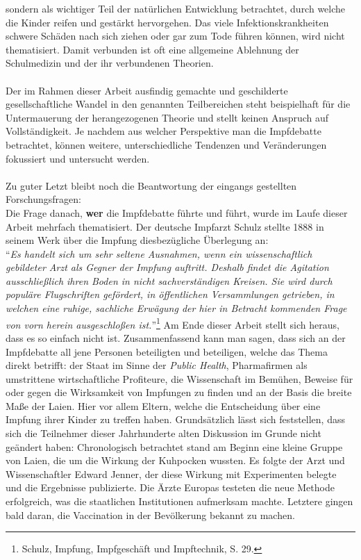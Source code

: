 \documentclass[
    a4paper,
    12pt,
    hyphens,
    chapterprefix=true,
    headheight=33pt,
    footheight=29pt,
    headings=optiontohead, %
]{scrartcl}
\begin{document}
{sondern als wichtiger Teil der natürlichen Entwicklung betrachtet, durch
welche die Kinder reifen und gestärkt hervorgehen. Das viele
Infektionskrankheiten schwere Schäden nach sich ziehen oder gar zum
Tode führen können, wird nicht thematisiert. Damit verbunden ist oft eine
allgemeine Ablehnung der Schulmedizin und der ihr verbundenen Theorien. \\
\\
Der im Rahmen dieser Arbeit ausfindig gemachte und geschilderte gesellschaftliche Wandel in den genannten Teilbereichen steht beispielhaft für die Untermauerung der herangezogenen Theorie und stellt keinen Anspruch auf Vollständigkeit. Je nachdem aus welcher Perspektive man die Impfdebatte betrachtet, können weitere, unterschiedliche Tendenzen und Veränderungen fokussiert und untersucht werden. \\
\\
Zu guter Letzt bleibt noch die Beantwortung der eingangs gestellten Forschungsfragen:\\
Die Frage danach, \textbf{wer} die Impfdebatte führte und führt, wurde im Laufe dieser Arbeit mehrfach  thematisiert. Der deutsche Impfarzt Schulz stellte 1888 in seinem Werk über die Impfung diesbezügliche Überlegung an:\\
"`\textit{Es handelt sich um sehr seltene Ausnahmen, wenn ein wissenschaftlich gebildeter Arzt als Gegner der Impfung auftritt. Deshalb findet die Agitation ausschließlich ihren Boden in nicht sachverständigen Kreisen. Sie wird durch populäre Flugschriften gefördert, in öffentlichen Versammlungen getrieben, in welchen eine ruhige, sachliche Erwägung der hier in Betracht kommenden Frage von vorn herein ausgeschloßen ist.}"'\footnote{Schulz, Impfung, Impfgeschäft und Impftechnik, S. 29.}
Am Ende dieser Arbeit stellt sich heraus, dass es so einfach nicht ist. Zusammenfassend kann man sagen, dass sich an der Impfdebatte all jene Personen beteiligten und beteiligen, welche das Thema direkt betrifft: der Staat im Sinne der \textit{Public Health}, Pharmafirmen als umstrittene wirtschaftliche Profiteure, die Wissenschaft im Bemühen, Beweise für oder gegen die Wirksamkeit von Impfungen zu finden und an der Basis die breite Maße der Laien. Hier vor allem Eltern, welche die Entscheidung über eine Impfung ihrer Kinder zu treffen haben. Grundsätzlich lässt sich feststellen, dass sich die Teilnehmer dieser Jahrhunderte alten Diskussion im Grunde nicht geändert haben: Chronologisch betrachtet stand am Beginn eine kleine Gruppe von Laien, die um die Wirkung der Kuhpocken wussten. Es folgte der Arzt und Wissenschaftler Edward Jenner, der diese Wirkung mit Experimenten belegte und die Ergebnisse publizierte.
Die Ärzte Europas testeten die neue Methode erfolgreich, was die staatlichen Institutionen aufmerksam machte.
Letztere gingen bald daran, die Vaccination in der Bevölkerung bekannt zu machen.

}
\end{document}
